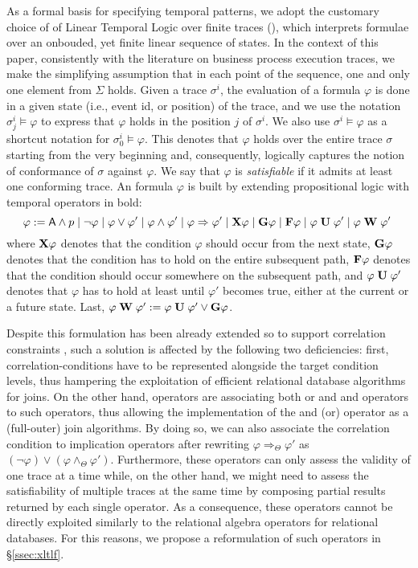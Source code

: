 As a formal basis for specifying temporal patterns, we adopt the customary choice of of Linear Temporal Logic over finite traces (\LTLf), which interprets formulae over an onbouded, yet finite linear sequence of states. In the context of this paper, consistently with the literature on business
 process execution traces, we make the simplifying assumption that in each point of the sequence, one and only one
element from $\Sigma$ holds. Given a trace $\sigma^i$, the evaluation of a formula $\varphi$ is done in a given state (i.e., event id, or position) of the trace, and we use the notation $\sigma^i_j\vDash\varphi$ to express that $\varphi$ holds in the position $j$ of $\sigma^i$. We also use $\sigma^i\vDash\varphi$ as a shortcut notation for $\sigma^i_0\vDash\varphi$. This
 denotes that $\varphi$ holds over the entire trace $\sigma$ starting from the very beginning and, consequently, logically captures the
 notion of conformance of $\sigma$ against $\varphi$. We say that $\varphi$ is \textit{satisfiable} if it admits at least one conforming trace. An \LTLf formula $\varphi$ is built by extending propositional logic with temporal operators in bold: \[\varphi:=\textsf{A}\wedge p\;|\;\neg \varphi\;|\;\varphi\vee \varphi'\;|\;\varphi\wedge\varphi'\;|\;\varphi\Rightarrow\varphi'\;|\;\mathbf{X}{\varphi}\;|\;\mathbf{G}{\varphi}\;|\;\mathbf{F}{\varphi}\;|\;{\varphi}\;\mathbf{U}\;{\varphi'}\;|\;{\varphi}\;\mathbf{W}\;{\varphi'}\;\] where $\mathbf{X}{\varphi}$ denotes that the condition $\varphi$ should occur from the next state, $\mathbf{G}{\varphi}$ denotes that the condition has to hold on the entire subsequent path, $\mathbf{F}{\varphi}$ denotes that the condition should occur somewhere on the subsequent path, and ${\varphi}\;\mathbf{U}\;{\varphi'}$ denotes that $\varphi$ has to hold at least until $\varphi'$ becomes true, either at the current or a future state. Last, ${\varphi}\;\mathbf{W}\;{\varphi'}:={\varphi}\;\mathbf{U}\;{\varphi'}\vee\mathbf{G}{\varphi}$.

Despite this formulation has been already extended so to support correlation constraints \cite{BurattinMS16}, such a solution is affected by the following two deficiencies: first, correlation-conditions have to be represented alongside the target condition levels, thus hampering the exploitation of efficient relational database algorithms for joins. On the other hand, \xLTLf operators are associating both or and and operators to such operators, thus allowing the implementation of the and (or) operator as a (full-outer) join algorithms. By doing so, we can also associate the correlation condition to implication operators after rewriting $\varphi\Rightarrow_\Theta\varphi'$ as $(\neg\varphi)\vee(\varphi\wedge_\Theta\varphi')$. Furthermore, these operators can only assess the validity of one trace at a time while, on the other hand, we might need to assess the satisfiability of multiple traces at the same time by composing partial results returned by each single operator. As a consequence, these operators cannot be directly exploited similarly to the relational algebra operators for relational databases. For this reasons, we propose a reformulation of such operators in \S\ref{ssec:xltlf}.
